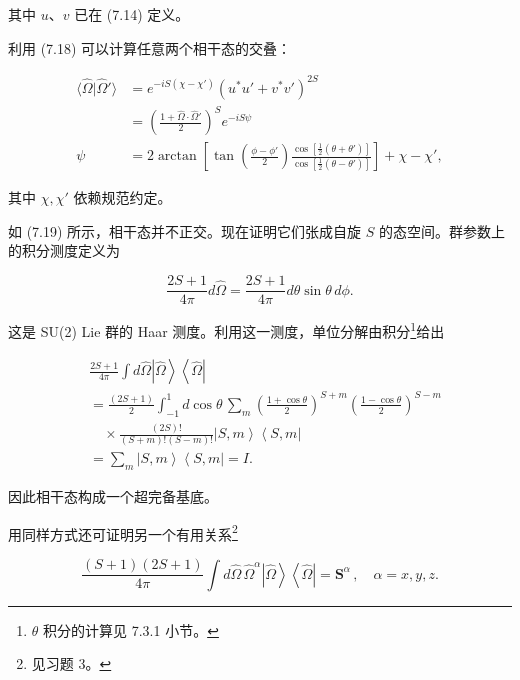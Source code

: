其中 $u$、$v$ 已在 (7.14) 定义。

利用 (7.18) 可以计算任意两个相干态的交叠：

\begin{align*}
\langle \hat {\Omega} | \hat {\Omega} ' \rangle & = e ^ {- i S ( \chi - \chi ' )} \left( u ^ {*} u ' + v ^ {*} v ' \right) ^ {2 S}\\
& = \left( \frac {1 + \hat {\Omega} \cdot \hat {\Omega} '}{2} \right) ^ {S} e ^ {- i S \psi}\\
\psi & = 2 \arctan \left[ \tan \left( \frac {\phi - \phi '}{2} \right) \frac {\cos \left[ \frac {1}{2} ( \theta + \theta ' ) \right]}{\cos \left[ \frac {1}{2} ( \theta - \theta ' ) \right]} \right] + \chi - \chi ' ,
\tag{7.19}
\end{align*}

其中 $\chi, \chi'$ 依赖规范约定。

如 (7.19) 所示，相干态并不正交。现在证明它们张成自旋 $S$ 的态空间。群参数上的积分测度定义为

\begin{equation*}
\frac {2 S + 1}{4 \pi} d \hat {\Omega} = \frac {2 S + 1}{4 \pi} d \theta \sin \theta \, d \phi .
\tag{7.20}
\end{equation*}

这是 SU(2) Lie 群的 Haar 测度。利用这一测度，单位分解由积分\footnote{{$\theta$} 积分的计算见 7.3.1 小节。}给出

\begin{align*}
& \frac {2 S + 1}{4 \pi} \int d \hat {\Omega} \left| \hat {\Omega} \right\rangle \left\langle \hat {\Omega} \right|\\
& = \frac {( 2 S + 1 )}{2} \int_ {- 1} ^ {1} d \cos \theta \, \sum_ {m} \left( \frac {1 + \cos \theta}{2} \right) ^ {S + m} \left( \frac {1 - \cos \theta}{2} \right) ^ {S - m}\\
& \quad \times \frac {( 2 S ) !}{( S + m ) ! ( S - m ) !} \left| S, m \right\rangle \left\langle S, m \right|\\
& = \sum_ {m} \left| S, m \right\rangle \left\langle S, m \right| = I .
\tag{7.21}
\end{align*}

因此相干态构成一个超完备基底。

用同样方式还可证明另一个有用关系\footnote{见习题 3。}

\begin{equation*}
\frac {( S + 1 ) ( 2 S + 1 )}{4 \pi} \int d \hat {\Omega} \, \hat {\Omega} ^ {\alpha} \left| \hat {\Omega} \right\rangle \left\langle \hat {\Omega} \right| = \mathbf {S} ^ {\alpha} \, , \quad \alpha = x, y, z.
\tag{7.22}
\end{equation*}

